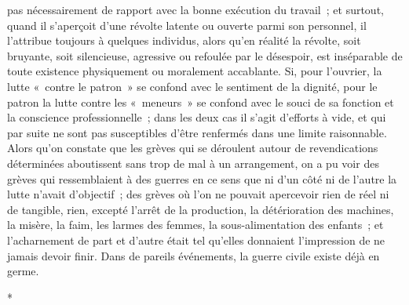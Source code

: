\documentclass[french,twoside]{book} %
\begin{document}
pas nécessairement de rapport avec la bonne exécution du travail ; et surtout, quand il s'aperçoit d'une révolte latente ou ouverte parmi son personnel, il l'attribue toujours à quelques individus, alors qu'en réalité la révolte, soit bruyante, soit silencieuse, agressive ou refoulée par le désespoir, est inséparable de toute existence physiquement ou morale­ment accablante. Si, pour l'ouvrier, la lutte « contre le patron » se confond avec le sentiment de la dignité, pour le patron la lutte contre les « meneurs » se confond avec le souci de sa fonction et la conscience professionnelle ; dans les deux cas il s'agit d'efforts à vide, et qui par suite ne sont pas susceptibles d'être renfermés dans une limite raisonnable. Alors qu’on constate que les grèves qui se déroulent autour de revendications déterminées aboutissent sans trop de mal à un arrangement, on a pu voir des grèves qui ressemblaient à des guerres en ce sens que ni d'un côté ni de l'autre la lutte n'avait d'objectif ; des grèves où l'on ne pouvait apercevoir rien de réel ni de tangible, rien, excepté l'arrêt de la production, la détérioration des machines, la misère, la faim, les larmes des femmes, la sous-alimentation des enfants ; et l'acharnement de part et d'autre était tel qu'elles donnaient l'impression de ne jamais devoir finir. Dans de pareils événements, la guerre civile existe déjà en germe.\par

\begin{center}
\noindent \centerline{*}\par
\end{center}
\end{document}
